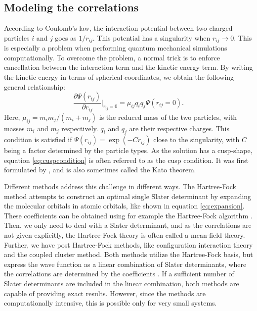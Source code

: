 \subsection{Modeling the correlations} \label{sec:cusp}
According to Coulomb's law, the interaction potential between two charged particles $i$ and $j$ goes as $1/{r_{ij}}$. This potential has a singularity when $r_{ij}\rightarrow 0$. This is especially a problem when performing quantum mechanical simulations computationally. To overcome the problem, a normal trick is to enforce cancellation between the interaction term and the kinetic energy term. By writing the kinetic energy in terms of spherical coordinates, we obtain the following general relationship\supercite{kato_on_1957}:
\begin{equation}
\frac{\partial\Psi(r_{ij})}{\partial r_{ij}}\bigg|_{r_{ij}=0}=\mu_{ij}q_iq_j\Psi(r_{ij}=0).
\label{eq:cuspcondition}
\end{equation}
Here, $\mu_{ij}=m_im_j/(m_i+m_j)$ is the reduced mass of the two particles, with masses $m_i$ and $m_j$ respectively. $q_i$ and $q_j$ are their respective charges. This condition is satisfied if $\Psi(r_{ij})=\exp(-Cr_{ij})$ close to the singularity, with $C$ being a factor determined by the particle types. As the solution has a cusp-shape, equation \eqref{eq:cuspcondition} is often referred to as the cusp condition. It was first formulated by \citet{kato_on_1957}, and is also sometimes called the Kato theorem. 

Different methods address this challenge in different ways. The Hartree-Fock method attempts to construct an optimal single Slater determinant by expanding the molecular orbitals in atomic orbitals, like shown in equation \eqref{eq:expansion}. These coefficients can be obtained using for example the Hartree-Fock algorithm \supercite{hartree_wave_1928, fock_selfconsistent_1930}. Then, we only need to deal with a Slater determinant, and as the correlations are not given explicitly, the Hartree-Fock theory is often called a mean-field theory. Further, we have post Hartree-Fock methods, like configuration interaction theory and the coupled cluster method. Both methods utilize the Hartree-Fock basis, but express the wave function as a linear combination of Slater determinants, where the correlations are determined by the coefficients \supercite{daniel_crawford_introduction_2007}. If a sufficient number of Slater determinants are included in the linear combination, both methods are capable of providing exact results. However, since the methods are computationally intensive, this is possible only for very small systems.


